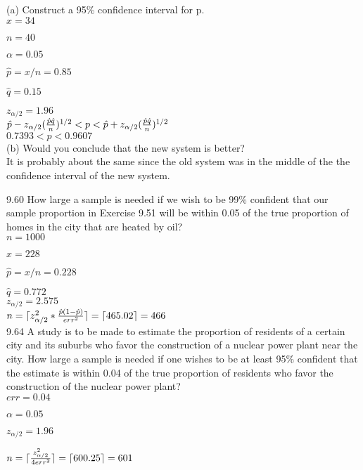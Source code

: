 (a) Construct a 95\% confidence interval for p. \\

$x = 34$

$n = 40$

$\alpha = 0.05$

$\hat{p} = x/n = 0.85$ 

$\hat{q} = 0.15$

$z_{\alpha/2} = 1.96$ \\

$\hat{p} - z_{\alpha/2} (\frac{\hat{p}\hat{q}}{n})^{1/2}
< p < 
\hat{p} + z_{\alpha/2} (\frac{\hat{p}\hat{q}}{n})^{1/2} $ \\

$0.7393 < p < 0.9607$ \\


(b) Would you conclude that the new system is better? \\

It is probably about the same since the old system was in the middle of the the confidence interval of the new system.

9.60 How large a sample is needed if we wish to be 99\% confident that our sample proportion in Exercise 9.51 will be within 0.05 of the true proportion of homes in the city that are heated by oil? \\

$n = 1000$

$x = 228$

$\hat{p} = x/n = 0.228$

$\hat{q} = 0.772$ \\

$z_{\alpha/2} = 2.575$ \\

$n = \lceil z_{\alpha/2}^2 * \frac{\hat{p}(1-\hat{p})}{err^2}\rceil = \lceil465.02\rceil = 466$ \\

9.64 A study is to be made to estimate the proportion of residents of a certain city and its suburbs who favor the construction of a nuclear power plant near the city. How large a sample is needed if one wishes to be at least 95\% confident that the estimate is within 0.04 of the true proportion of residents who favor the construction of the nuclear power plant? \\

$err = 0.04$

$\alpha = 0.05$

$z_{\alpha/2} = 1.96$

$n = \lceil\frac{z^2_{\alpha/2}}{4err^2}\rceil = \lceil600.25\rceil = 601$ \\

